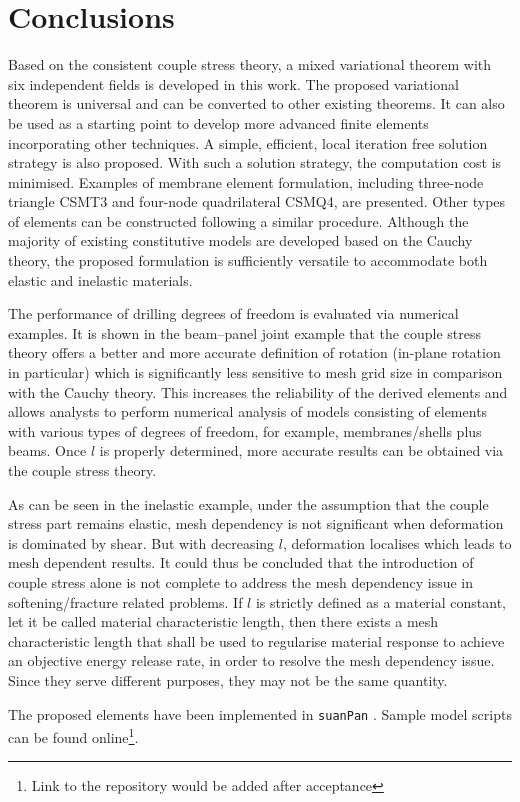 \documentclass[3p,sort&compress,11pt,fleqn,review]{elsarticle}
\begin{document}
\section{Conclusions}
Based on the consistent couple stress theory, a mixed variational theorem with six independent fields is developed in this work. The proposed variational theorem is universal and can be converted to other existing theorems. It can also be used as a starting point to develop more advanced finite elements incorporating other techniques. A simple, efficient, local iteration free solution strategy is also proposed. With such a solution strategy, the computation cost is minimised. Examples of membrane element formulation, including three-node triangle CSMT3 and four-node quadrilateral CSMQ4, are presented. Other types of elements can be constructed following a similar procedure. Although the majority of existing constitutive models are developed based on the Cauchy theory, the proposed formulation is sufficiently versatile to accommodate both elastic and inelastic materials.

The performance of drilling degrees of freedom is evaluated via numerical examples. It is shown in the beam--panel joint example that the couple stress theory offers a better and more accurate definition of rotation (in-plane rotation in particular) which is significantly less sensitive to mesh grid size in comparison with the Cauchy theory. This increases the reliability of the derived elements and allows analysts to perform numerical analysis of models consisting of elements with various types of degrees of freedom, for example, membranes/shells plus beams. Once $l$ is properly determined, more accurate results can be obtained via the couple stress theory.

As can be seen in the inelastic example, under the assumption that the couple stress part remains elastic, mesh dependency is not significant when deformation is dominated by shear. But with decreasing $l$, deformation localises which leads to mesh dependent results. It could thus be concluded that the introduction of couple stress alone is not complete to address the mesh dependency issue in softening/fracture related problems. If $l$ is strictly defined as a material constant, let it be called material characteristic length, then there exists a mesh characteristic length that shall be used to regularise material response to achieve an objective energy release rate, in order to resolve the mesh dependency issue. Since they serve different purposes, they may not be the same quantity.

The proposed elements have been implemented in \texttt{suanPan} \citep{Chang2021}. Sample model scripts can be found online\footnote{Link to the repository would be added after acceptance}.


\end{document}
